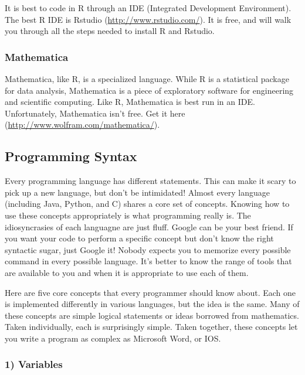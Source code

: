 \documentclass[a4paper]{article}
\begin{document}
It is best to code in R through an IDE (Integrated Development Environment). The best R IDE is Rstudio (\url{http://www.rstudio.com/}). It is free, and will walk you through all the steps needed to install R and Rstudio.

\subsubsection{Mathematica}
Mathematica, like R, is a specialized language. While R is a statistical package for data analysis, Mathematica is a piece of exploratory software for engineering and scientific computing. Like R, Mathematica is best run in an IDE. Unfortunately, Mathematica isn't free. Get it here (\url{http://www.wolfram.com/mathematica/}).

\subsection{Programming Syntax}

Every programming language has different statements. This can make it scary to pick up a new language, but don't be intimidated! Almost every language (including Java, Python, and C) shares a core set of concepts. Knowing how to use these concepts appropriately is what programming really is. The idiosyncrasies of each languagne are just fluff. Google can be your best friend. If you want your code to perform a specific concept but don't know the right syntactic sugar, just Google it! Nobody expects you to memorize every possible command in every possible language. It's better to know the range of tools that are available to you and when it is appropriate to use each of them.

Here are five core concepts that every programmer should know about. Each one is implemented differently in various languages, but the idea is the same. Many of these concepts are simple logical statements or ideas borrowed from mathematics. Taken individually, each is surprisingly simple. Taken together, these concepts let you write a program as complex as Microsoft Word, or IOS.

\subsubsection{1) Variables}
\end{document}
